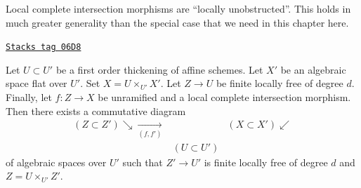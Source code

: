 Local complete intersection morphisms are ``locally unobstructed''.
This holds in much greater generality than the special case
that we need in this chapter here.

\begin{lemma}
\label{criteria-lemma-lci-unobstructed}
\href{https://stacks.math.columbia.edu/tag/06D8}{\texttt{Stacks tag 06D8}}

Let $U \subset U'$ be a first order thickening of affine schemes.
Let $X'$ be an algebraic space flat over $U'$. Set $X = U \times_{U'} X'$.
Let $Z \to U$ be finite locally free of degree $d$. Finally, let
$f : Z \to X$ be unramified and a local complete intersection morphism.
Then there exists a commutative diagram
$$
\begin{array}{ccc}(Z \subset Z') \searrow\underset{(f, f')}{\longrightarrow} &  & (X \subset X') \swarrow \\  & (U \subset U') & \end{array}
$$
of algebraic spaces over $U'$ such that $Z' \to U'$ is finite locally free
of degree $d$ and $Z = U \times_{U'} Z'$.
\end{lemma}


